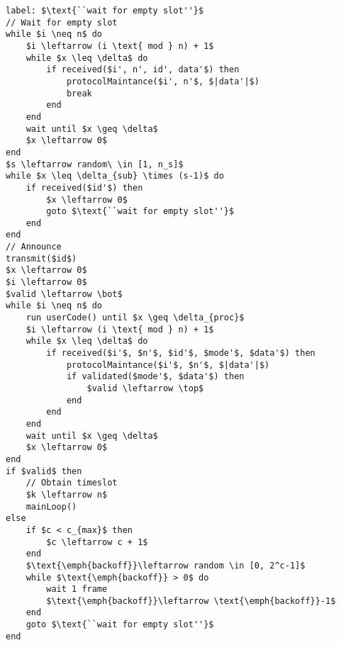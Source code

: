 \begin{lstlisting}[style=pseudocode, mathescape=true, float, floatplacement=p, caption={Modified section of initialise procedure for when network found.}, label=lst:pseudoInitMulti]
label: $\text{``wait for empty slot''}$
// Wait for empty slot
while $i \neq n$ do
    $i \leftarrow (i \text{ mod } n) + 1$
    while $x \leq \delta$ do
        if received($i', n', id', data'$) then
            protocolMaintance($i', n'$, $|data'|$)
            break
        end
    end
    wait until $x \geq \delta$
    $x \leftarrow 0$
end
$s \leftarrow random\ \in [1, n_s]$
while $x \leq \delta_{sub} \times (s-1)$ do
    if received($id'$) then
        $x \leftarrow 0$
        goto $\text{``wait for empty slot''}$
    end
end
// Announce 
transmit($id$)
$x \leftarrow 0$
$i \leftarrow 0$
$valid \leftarrow \bot$
while $i \neq n$ do
    run userCode() until $x \geq \delta_{proc}$
    $i \leftarrow (i \text{ mod } n) + 1$
    while $x \leq \delta$ do
        if received($i'$, $n'$, $id'$, $mode'$, $data'$) then
            protocolMaintance($i'$, $n'$, $|data'|$)
            if validated($mode'$, $data'$) then
                $valid \leftarrow \top$
            end    
        end
    end
    wait until $x \geq \delta$
    $x \leftarrow 0$
end
if $valid$ then
    // Obtain timeslot
    $k \leftarrow n$
    mainLoop()
else
    if $c < c_{max}$ then
        $c \leftarrow c + 1$
    end
    $\text{\emph{backoff}}\leftarrow random \in [0, 2^c-1]$
    while $\text{\emph{backoff}} > 0$ do
        wait 1 frame
        $\text{\emph{backoff}}\leftarrow \text{\emph{backoff}}-1$ 
    end
    goto $\text{``wait for empty slot''}$
end
\end{lstlisting}


